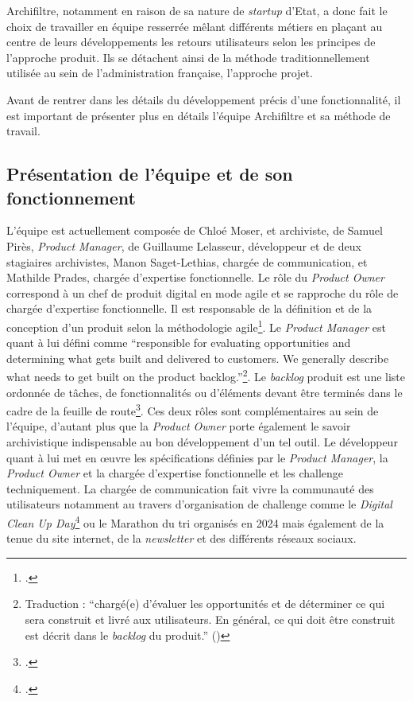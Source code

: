 

\gls{Archifiltre}, notamment en raison de sa nature de \textit{startup} d’Etat, a donc fait le choix de travailler en équipe resserrée mêlant différents métiers en plaçant au centre de leurs développements les retours utilisateurs selon les principes de l’approche produit. Ils se détachent ainsi de la méthode traditionnellement utilisée au sein de l’administration française, l’approche projet. 


Avant de rentrer dans les détails du développement précis d’une fonctionnalité, il est important de présenter plus en détails l’équipe Archifiltre et sa méthode de travail. 

\subsection{Présentation de l’équipe et de son fonctionnement}
L’équipe est actuellement composée de Chloé Moser,  et archiviste, de Samuel Pirès, \textit{\gls{Product Manager}}, de Guillaume Lelasseur, développeur et de deux stagiaires archivistes, Manon Saget-Lethias, chargée de communication, et Mathilde Prades, chargée d’expertise fonctionnelle. Le rôle du \textit{\gls{Product Owner}} correspond à un chef de produit digital en mode \gls{agile} et se rapproche du rôle de chargée d'expertise fonctionnelle. Il est responsable de la définition et de la conception d'un produit selon la méthodologie \gls{agile}\footcite{lesparre_product_2023}. Le \textit{\gls{Product Manager}} est quant à lui défini comme \enquote{responsible for evaluating opportunities and determining what gets built and delivered to customers. We generally describe what needs to get built on the product backlog.}\footnote{Traduction : \enquote{chargé(e) d'évaluer les opportunités et de déterminer ce qui sera construit et livré aux utilisateurs. En général, ce qui doit être construit est décrit dans le \textit{backlog} du produit.} (\cite[pp.42-43]{cagan_inspired_2017})}. Le \textit{backlog} produit est une liste ordonnée de tâches, de fonctionnalités ou d'éléments devant être terminés dans le cadre de la feuille de route\footcite{raeburn_gestion_2024}. Ces deux rôles sont complémentaires au sein de l’équipe, d’autant plus que la \textit{\gls{Product Owner}} porte également le savoir archivistique indispensable au bon développement d’un tel outil. Le développeur quant à lui met en œuvre les spécifications définies par le \textit{\gls{Product Manager}}, la \textit{\gls{Product Owner}} et la chargée d'expertise fonctionnelle et les challenge techniquement. La chargée de communication fait vivre la communauté des utilisateurs notamment au travers d’organisation de challenge comme le \textit{Digital Clean Up Day}\footcite{moser_digital_2024} ou le Marathon du tri organisés en 2024 mais également de la tenue du site internet, de la \textit{newsletter} et des différents réseaux sociaux.


